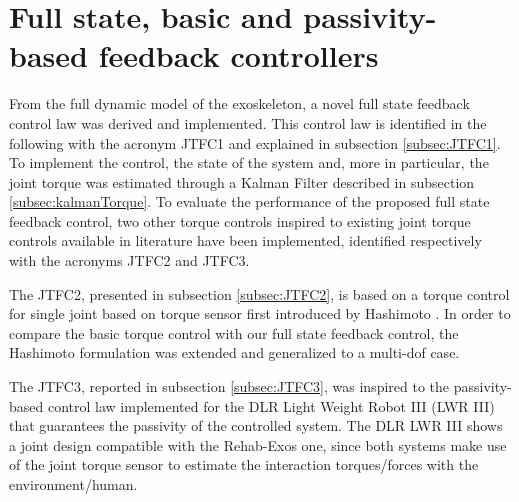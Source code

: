 \section{Full state, basic and passivity-based feedback controllers} 
\label{sec:Full_state_feedback_controllers}

From the full dynamic model of the exoskeleton, a novel  full state feedback control law   was  derived and implemented. This control law is  identified in the following with the acronym JTFC1  and  explained in subsection \ref{subsec:JTFC1}.
To implement the control, the state of the system and, more in particular, the joint torque was estimated through a Kalman Filter described in  subsection \ref{subsec:kalmanTorque}.
To evaluate the performance of  the proposed full state feedback control,  two other torque controls inspired to existing joint torque controls available in literature have been implemented, identified respectively with the acronyms JTFC2 and JTFC3.
\par The JTFC2, presented in subsection \ref{subsec:JTFC2}, is based on a  torque control   for  single joint based on torque sensor first  introduced by Hashimoto \cite{hashimoto1998experimental}. In order to compare the basic torque control with our full state feedback control, the Hashimoto formulation was extended and generalized to a multi-dof case. 
\par The JTFC3, reported in subsection \ref{subsec:JTFC3}, was inspired to the passivity-based control law \cite{kugi2008passivity}
implemented for the DLR Light Weight Robot III (LWR III)   that guarantees the passivity of the controlled system. The DLR LWR III shows a joint design compatible with the Rehab-Exos one, since both systems make use of the joint torque sensor to estimate the interaction torques/forces with the environment/human.


